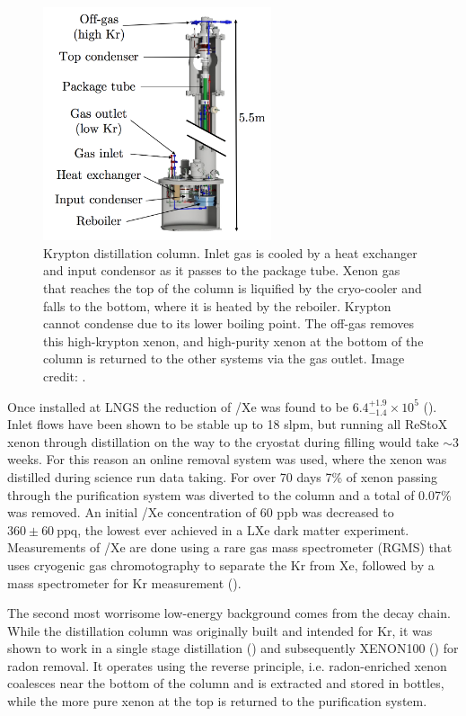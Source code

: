 \begin{figure}
\centering
\includegraphics[width=0.6\textwidth]{KrColumn}
\caption{Krypton distillation column.  Inlet gas is cooled by a heat exchanger and input condensor as it passes to the package
tube.  Xenon gas that reaches the top of the
column is liquified by the cryo-cooler and falls to the bottom, where it is heated by the reboiler.  Krypton cannot condense due to its
lower boiling point.  The off-gas removes this high-krypton xenon, and high-purity xenon at the bottom of the column is returned to the
other systems via the gas outlet.  Image credit: .}
\label{fig:xeno1t_kr_dist_column}
\end{figure}

Once installed at LNGS the reduction of /Xe was found to be $6.4_{-1.4}^{+1.9} \times 10^{5}$
().  Inlet flows have been shown to be stable up to 18 slpm, but running all ReStoX xenon through distillation on the
way to the cryostat during filling would take ${\sim}3$ weeks.  For this reason an online removal system was used, where the xenon was
distilled during
science run data taking.  For over 70 days 7\% of xenon passing through the purification system was diverted to the column and a total
of 0.07\% was
removed.  An initial /Xe concentration of 60 ppb was decreased to $360 \pm 60\ \mathrm{ppq}$, the lowest ever achieved in a
LXe dark matter experiment.  Measurements of /Xe are done using a rare gas mass spectrometer (RGMS) that uses cryogenic gas
chromotography to separate the Kr from Xe, followed by a mass spectrometer for Kr measurement ().

The second most worrisome low-energy background comes from the  decay chain.  While the distillation column was originally
built and intended for Kr,
it was shown to work in a single stage distillation () and subsequently XENON100
() for radon removal.  It operates using the reverse principle, i.e. radon-enriched xenon coalesces near the bottom
of the column and is extracted and stored in bottles, while the more pure xenon at the top is returned to the purification system.



